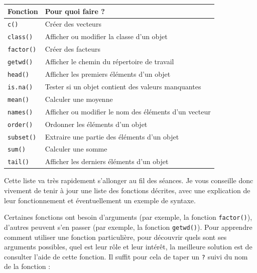 \documentclass[
  a4paper,
  DIV=11,
  numbers=noendperiod,
  oneside]{scrreprt}
\begin{document}
\begin{longtable}[]{@{}
  >{\raggedleft\arraybackslash}p{}
  >{\raggedright\arraybackslash}p{}@{}}
\toprule\noalign{}
\begin{minipage}[b]{\linewidth}\raggedleft
Fonction
\end{minipage} & \begin{minipage}[b]{\linewidth}\raggedright
Pour quoi faire ?
\end{minipage} \\
\midrule\noalign{}
\endhead
\bottomrule\noalign{}
\endlastfoot
\texttt{c()} & Créer des vecteurs \\
\texttt{class()} & Afficher ou modifier la classe d'un objet \\
\texttt{factor()} & Créer des facteurs \\
\texttt{getwd()} & Afficher le chemin du répertoire de travail \\
\texttt{head()} & Afficher les premiers éléments d'un objet \\
\texttt{is.na()} & Tester si un objet contient des valeurs manquantes \\
\texttt{mean()} & Calculer une moyenne \\
\texttt{names()} & Afficher ou modifier le nom des éléments d'un
vecteur \\
\texttt{order()} & Ordonner les éléments d'un objet \\
\texttt{subset()} & Extraire une partie des éléments d'un objet \\
\texttt{sum()} & Calculer une somme \\
\texttt{tail()} & Afficher les derniers éléments d'un objet \\
\end{longtable}

Cette liste va très rapidement s'allonger au fil des séances. Je vous
conseille donc vivement de tenir à jour une liste des fonctions
décrites, avec une explication de leur fonctionnement et éventuellement
un exemple de syntaxe.

Certaines fonctions ont besoin d'arguments (par exemple, la fonction
\texttt{factor()}), d'autres peuvent s'en passer (par exemple, la
fonction \texttt{getwd()}). Pour apprendre comment utiliser une fonction
particulière, pour découvrir quels sont ses arguments possibles, quel
est leur rôle et leur intérêt, la meilleure solution est de consulter
l'aide de cette fonction. Il suffit pour cela de taper un \texttt{?}
suivi du nom de la fonction :
\end{document}
